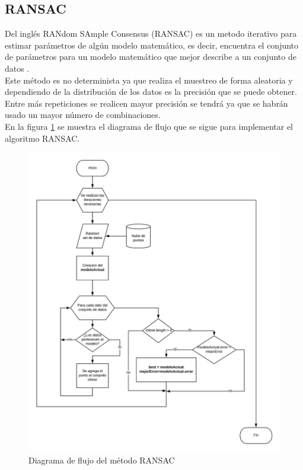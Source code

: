 \subsection{RANSAC}

Del inglés RANdom SAmple Consensus (RANSAC) es un \gls{metodo} iterativo para estimar parámetros de algún modelo matemático, es decir, encuentra el conjunto de parámetros para un modelo matemático que mejor describe a un conjunto de datos \cite{Fischler1981}. \\

Este método es no determinista ya que realiza el muestreo de forma aleatoria y dependiendo de la distribución de los datos es la precisión que se puede obtener. Entre más repeticiones se realicen mayor precisión se tendrá ya que se habrán usado un mayor número de combinaciones.\\

En la figura \ref{fig:RANSAC} se muestra el diagrama de flujo que se sigue para implementar el \gls{algoritmo} RANSAC.\\

\begin{figure}[!htb]
	\centering
	\includegraphics[width=1\textwidth]{01Introduccion/imagenes/RANSAC.jpeg}
	\caption{Diagrama de flujo del método RANSAC}
	\label{fig:RANSAC}
\end{figure}

